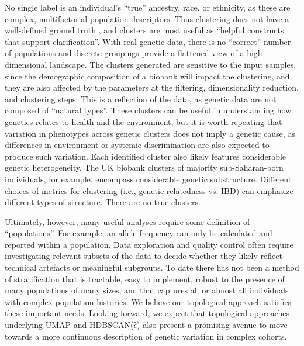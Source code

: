 No single label is an individual's ``true'' ancestry, race, or ethnicity, as these are complex, multifactorial population descriptors\citep{martschenko_including_2023,roth_multiple_2016}. Thus clustering does not have a well-defined ground truth \citep{ben-david_clustering_2018}, and clusters are most useful as ``helpful constructs that support clarification''\citep{hennig_what_2015}. With real genetic data, there is no ``correct'' number of populations\citep{lawson_tutorial_2018} and discrete groupings provide a flattened view of a high-dimensional landscape\citep{martschenko_including_2023,lewis_getting_2022}. The clusters generated are sensitive to the input samples, since the demographic composition of a biobank will impact the clustering, and they are also affected by the parameters at the filtering, dimensionality reduction, and clustering steps. This is a reflection of the data, as genetic data are not composed of ``natural types''. These clusters can be useful in understanding how genetics relates to health and the environment, but it is worth repeating that variation in phenotypes across genetic clusters does not imply a genetic cause, as differences in environment or systemic discrimination are also expected to produce such variation\citep{vyas_hidden_2020}. Each identified cluster also likely features considerable genetic heterogeneity. The UK biobank clusters of majority sub-Saharan-born individuals, for example, encompass considerable genetic substructure\citep{choudhury_high-depth_2020}. Different choices of metrics for clustering (i.e., genetic relatedness vs. IBD) can emphasize different types of structure. There are no true clusters. 

Ultimately, however, many useful analyses require some definition of ``populations''. For example, an allele frequency can only be calculated and reported within a population. Data exploration and quality control often require investigating relevant subsets of the data to decide whether they likely reflect technical artefacts or meaningful subgroups.  To date there has not been a method of stratification that is tractable, easy to implement, robust to the presence of many populations of many sizes, and that captures all or almost all individuals with complex population histories. We believe our topological approach satisfies these important needs. Looking forward, we expect that topological approaches underlying UMAP and HDBSCAN($\hat{\epsilon}$) also present a promising avenue to move towards a more continuous description of genetic variation in complex cohorts. 

